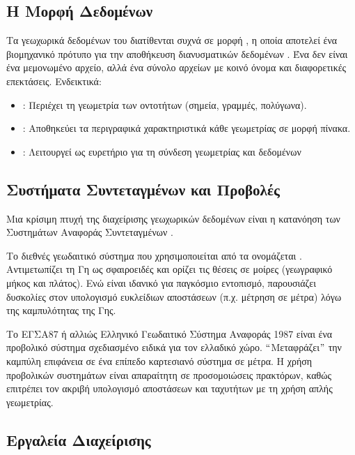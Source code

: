 \subsection{Η Μορφή Δεδομένων }

Τα γεωχωρικά δεδομένων του  διατίθενται συχνά σε μορφή
, η οποία αποτελεί ένα βιομηχανικό πρότυπο
για την αποθήκευση διανυσματικών δεδομένων .
Ένα  δεν είναι ένα μεμονωμένο αρχείο, αλλά ένα
σύνολο αρχείων με κοινό όνομα και διαφορετικές επεκτάσεις.
Ενδεικτικά:

\begin{itemize}
\item {}: Περιέχει τη γεωμετρία των οντοτήτων (σημεία, 
γραμμές, πολύγωνα).
\item {}: Αποθηκεύει τα περιγραφικά χαρακτηριστικά
 κάθε γεωμετρίας σε μορφή πίνακα.
\item {}: Λειτουργεί ως ευρετήριο  για τη
σύνδεση γεωμετρίας και δεδομένων
\end{itemize}

\subsection{Συστήματα Συντεταγμένων και Προβολές}

Μια κρίσιμη πτυχή της διαχείρισης γεωχωρικών δεδομένων είναι η
κατανόηση των Συστημάτων Αναφοράς Συντεταγμένων .

Το διεθνές γεωδαιτικό σύστημα που χρησιμοποιείται από τα 
ονομάζεται . Αντιμετωπίζει τη Γη ως
σφαιροειδές και ορίζει τις θέσεις σε μοίρες (γεωγραφικό μήκος και
πλάτος). Ενώ είναι ιδανικό για παγκόσμιο εντοπισμό, παρουσιάζει
δυσκολίες στον υπολογισμό ευκλείδιων αποστάσεων (π.χ. μέτρηση
σε μέτρα) λόγω της καμπυλότητας της Γης.

Το ΕΓΣΑ87  ή αλλιώς Ελληνικό Γεωδαιτικό Σύστημα
Αναφοράς 1987 είναι ένα προβολικό σύστημα σχεδιασμένο ειδικά για
τον ελλαδικό χώρο. $``$Μεταφράζει$"$ την καμπύλη επιφάνεια σε ένα
επίπεδο καρτεσιανό σύστημα  σε μέτρα. Η χρήση
προβολικών συστημάτων είναι απαραίτητη σε προσομοιώσεις πρακτόρων,
καθώς επιτρέπει τον ακριβή υπολογισμό αποστάσεων και ταχυτήτων με
τη χρήση απλής γεωμετρίας.

\subsection{Εργαλεία Διαχείρισης }

